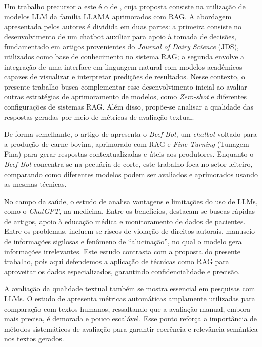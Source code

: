 Um trabalho precursor a este é o de \cite{agents_in_dairy_science}, cuja proposta consiste na utilização de modelos LLM da família LLAMA \cite{touvron2023llamaopenefficientfoundation} aprimorados com RAG. A abordagem apresentada pelos autores é dividida em duas partes: a primeira consiste no desenvolvimento de um chatbot auxiliar para apoio à tomada de decisões, fundamentado em artigos provenientes do \textit{Journal of Dairy Science} (JDS), utilizados como base de conhecimento no sistema RAG; a segunda envolve a integração de uma interface em linguagem natural com modelos acadêmicos capazes de visualizar e interpretar predições de resultados. Nesse contexto, o presente trabalho busca complementar esse desenvolvimento inicial ao avaliar outras estratégias de aprimoramento de modelos, como \textit{Zero-shot} e diferentes configurações de sistemas RAG. Além disso, propõe-se analisar a qualidade das respostas geradas por meio de métricas de avaliação textual.

De forma semelhante, o artigo de \cite{zhang-etal-2025-beefbot} apresenta o \textit{Beef Bot}, um \textit{chatbot} voltado para a produção de carne bovina, aprimorado com RAG e \textit{Fine Turning} (Tunagem Fina) \cite{fine_turning_llm_for_specialized_use_cases} para gerar respostas contextualizadas e úteis aos produtores. Enquanto o \textit{Beef Bot} concentra-se na pecuária de corte, este trabalho foca no setor leiteiro, comparando como diferentes modelos podem ser avaliados e aprimorados usando as mesmas técnicas.

No campo da saúde, o estudo de \cite{ChatGPTInMedicice} analisa vantagens e limitações do uso de LLMs, como o \textit{ChatGPT}, na medicina. Entre os benefícios, destacam-se buscas rápidas de artigos, apoio à educação médica e monitoramento de dados de pacientes. Entre os problemas, incluem-se riscos de violação de direitos autorais, manuseio de informações sigilosas e fenômeno de “alucinação”, no qual o modelo gera informações irrelevantes. Este estudo contrasta com a proposta do presente trabalho, pois aqui defendemos a aplicação de técnicas como RAG para aproveitar os dados especializados, garantindo confidencialidade e precisão.

A avaliação da qualidade textual também se mostra essencial em pesquisas com LLMs. O estudo de \cite{nguyen2024comparative} apresenta métricas automáticas amplamente utilizadas para comparação com textos humanos, ressaltando que a avaliação manual, embora mais precisa, é demorada e pouco escalável. Esse ponto reforça a importância de métodos sistemáticos de avaliação para garantir coerência e relevância semântica nos textos gerados.


